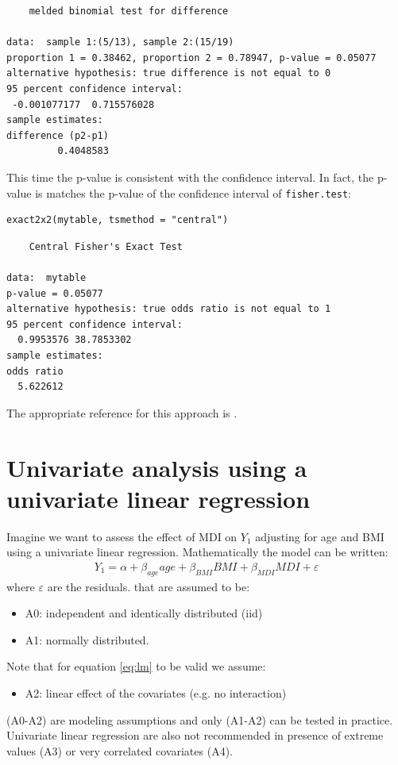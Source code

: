 \documentclass{article}
\begin{document}
\begin{verbatim}
	melded binomial test for difference

data:  sample 1:(5/13), sample 2:(15/19)
proportion 1 = 0.38462, proportion 2 = 0.78947, p-value = 0.05077
alternative hypothesis: true difference is not equal to 0
95 percent confidence interval:
 -0.001077177  0.715576028
sample estimates:
difference (p2-p1) 
         0.4048583
\end{verbatim}

This time the p-value is consistent with the confidence interval. In
fact, the p-value is matches the p-value of the confidence interval of
\texttt{fisher.test}:
\lstset{language=r,label= ,caption= ,captionpos=b,numbers=none}
\begin{lstlisting}
exact2x2(mytable, tsmethod = "central")
\end{lstlisting}

\begin{verbatim}
	Central Fisher's Exact Test

data:  mytable
p-value = 0.05077
alternative hypothesis: true odds ratio is not equal to 1
95 percent confidence interval:
  0.9953576 38.7853302
sample estimates:
odds ratio 
  5.622612
\end{verbatim}

The appropriate reference for this approach is \citep{fay2015combining}.
\clearpage

\section{Univariate analysis using a univariate linear regression}
\label{sec:LM}
Imagine we want to assess the effect of MDI on \(Y_1\)
adjusting for age and BMI using a univariate linear
regression. Mathematically the model can be written:
\begin{align}
Y_1 = \alpha + \beta_{age} age + \beta_{BMI} BMI + \beta_{MDI} MDI + \varepsilon \label{eq:lm}
\end{align}
where \(\varepsilon\) are the residuals. that are assumed to be:
\begin{itemize}
\item A0: independent and identically distributed (iid)
\item A1: normally distributed.
\end{itemize}
Note that for equation \eqref{eq:lm} to be valid we assume:
\begin{itemize}
\item A2: linear effect of the covariates (e.g. no interaction)
\end{itemize}
(A0-A2) are modeling assumptions and only (A1-A2) can be tested in
practice. Univariate linear regression are also not recommended in
presence of extreme values (A3) or very correlated covariates (A4).
\end{document}
